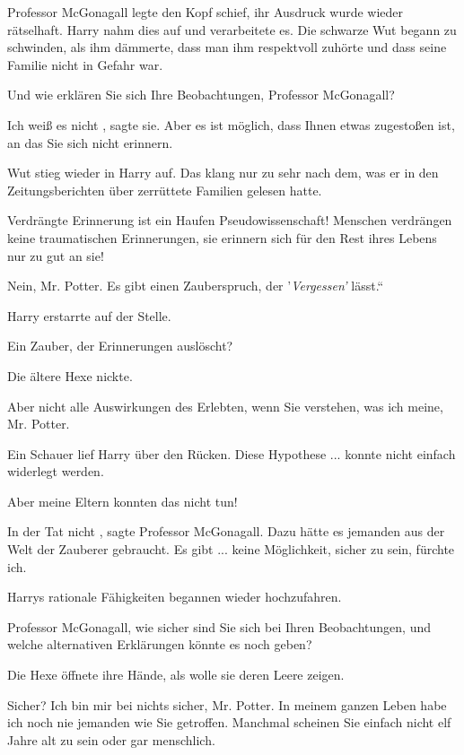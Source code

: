 Professor McGonagall legte den Kopf schief, ihr Ausdruck wurde wieder
rätselhaft. Harry nahm dies auf und verarbeitete es. Die schwarze Wut begann
zu schwinden, als ihm dämmerte, dass man ihm respektvoll zuhörte und dass
seine Familie nicht in Gefahr war.

\glqq Und wie erklären Sie sich Ihre Beobachtungen, Professor McGonagall?\grqq{}

\glqq Ich weiß es nicht\grqq{} , sagte sie. \glqq Aber es ist möglich, dass
Ihnen etwas zugestoßen ist, an das Sie sich nicht erinnern.\grqq{}

Wut stieg wieder in Harry auf. Das klang nur zu sehr nach dem, was er in den
Zeitungsberichten über zerrüttete Familien gelesen hatte.

\glqq Verdrängte Erinnerung ist ein Haufen Pseudowissenschaft! Menschen
verdrängen keine traumatischen Erinnerungen, sie erinnern sich für den Rest
ihres Lebens nur zu gut an sie!\grqq{}

\glqq Nein, Mr. Potter. Es gibt einen Zauberspruch, der '\emph{Vergessen'}
lässt.“

Harry erstarrte auf der Stelle.

\glqq Ein Zauber, der Erinnerungen auslöscht?\grqq{}

Die ältere Hexe nickte.

\glqq Aber nicht alle Auswirkungen des Erlebten, wenn Sie verstehen, was ich
meine, Mr. Potter.\grqq{}

Ein Schauer lief Harry über den Rücken. Diese Hypothese ... konnte nicht einfach
widerlegt werden.

\glqq Aber meine Eltern konnten das nicht tun!\grqq{}

\glqq In der Tat nicht\grqq{} , sagte Professor McGonagall. \glqq Dazu hätte es
jemanden aus der Welt der Zauberer gebraucht. Es gibt ... keine Möglichkeit,
sicher zu sein, fürchte ich.\grqq{}

Harrys rationale Fähigkeiten begannen wieder hochzufahren.

\glqq Professor McGonagall, wie sicher sind Sie sich bei Ihren Beobachtungen,
und welche alternativen Erklärungen könnte es noch geben?\grqq{}

Die Hexe öffnete ihre Hände, als wolle sie deren Leere zeigen.

\glqq Sicher? Ich bin mir bei nichts sicher, Mr. Potter. In meinem ganzen Leben
habe ich noch nie jemanden wie Sie getroffen. Manchmal scheinen Sie einfach
nicht elf Jahre alt zu sein oder gar menschlich.\grqq{}


